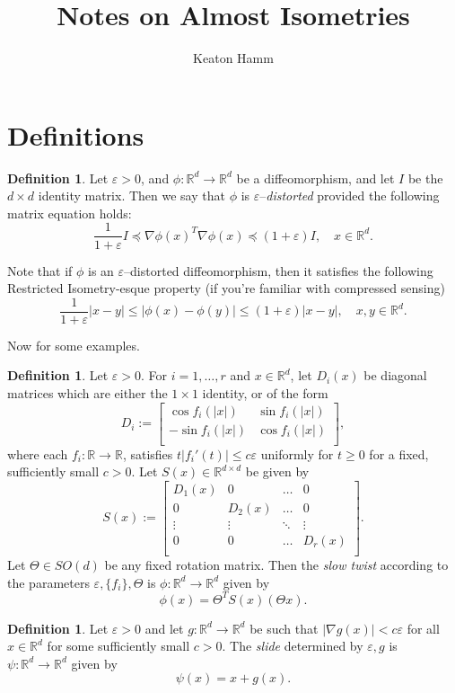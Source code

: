 \documentclass{amsart}
\title{Notes on Almost Isometries}
\author{Keaton Hamm}
\theoremstyle{remark}
\theoremstyle{definition}
\newtheorem{definition}[theorem]{Definition}
\newcommand{\R}{\mathbb{R}}
\newcommand{\eps}{\varepsilon}
\begin{document}
\maketitle

\section{Definitions}

\begin{definition}
Let $\eps>0$, and $\phi:\R^d\to\R^d$ be a diffeomorphism, and let $I$ be the $d\times d$ identity matrix.  Then we say that $\phi$ is $\eps$--\textit{distorted} provided the following matrix equation holds:
\[ \frac{1}{1+\eps}I \preceq \nabla\phi(x)^T\nabla\phi(x) \preceq (1+\eps)I, \quad x\in\R^d.\]
\end{definition}

Note that if $\phi$ is an $\eps$--distorted diffeomorphism, then it satisfies the following Restricted Isometry-esque property (if you're familiar with compressed sensing)
\[ \frac{1}{1+\eps}|x-y| \leq |\phi(x)-\phi(y)| \leq (1+\eps)|x-y|,\quad x,y\in\R^d. \]

Now for some examples.

\begin{definition}
Let $\eps>0$. For $i=1,\dots,r$ and $x\in\R^d$, let $D_i(x)$ be diagonal matrices which are either the $1\times 1$ identity, or of the form
\[ D_i := \begin{bmatrix} \cos f_i(|x|) & \sin f_i(|x|) \\ -\sin f_i(|x|) & \cos f_i(|x|)\\\end{bmatrix}, \]
where each $f_i:\R\to\R$, satisfies $t|f_i'(t)|\leq c\eps$ uniformly for $t\geq0$ for a fixed, sufficiently small $c>0$. Let $S(x)\in\R^{d\times d}$ be given by
\[
S(x) :=
\begin{bmatrix}
D_1(x) & 0 &  \dots & 0\\
0 & D_2(x) &  \dots & 0\\
\vdots & \vdots & \ddots &  \vdots\\
 0 & 0  & \dots & D_r(x)\\
\end{bmatrix}.
\]
Let $\Theta\in SO(d)$ be any fixed rotation matrix.   Then the \textit{slow twist} according to the parameters $\eps,\{f_i\},\Theta$ is $\phi:\R^d\to\R^d$ given by
\[ \phi(x) = \Theta^TS(x)(\Theta x).\]
\end{definition}

\begin{definition}
Let $\eps>0$ and let $g:\R^d\to\R^d$ be such that $|\nabla g(x)| <c\eps$ for all $x\in\R^d$ for some sufficiently small $c>0$.  The \textit{slide} determined by $\eps,g$ is $\psi:\R^d\to\R^d$ given by
\[ \psi(x) = x+g(x).\]
\end{definition}
\end{document}
